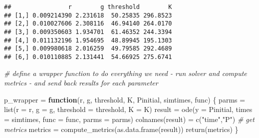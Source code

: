 \documentclass[
]{article}
\newenvironment{Shaded}{\begin{snugshade}}{\end{snugshade}}
\newcommand{\AttributeTok}[1]{\textcolor[rgb]{0.77,0.63,0.00}{#1}}
\newcommand{\CommentTok}[1]{\textcolor[rgb]{0.56,0.35,0.01}{\textit{#1}}}
\newcommand{\ConstantTok}[1]{\textcolor[rgb]{0.00,0.00,0.00}{#1}}
\newcommand{\ControlFlowTok}[1]{\textcolor[rgb]{0.13,0.29,0.53}{\textbf{#1}}}
\newcommand{\DecValTok}[1]{\textcolor[rgb]{0.00,0.00,0.81}{#1}}
\newcommand{\FunctionTok}[1]{\textcolor[rgb]{0.00,0.00,0.00}{#1}}
\newcommand{\NormalTok}[1]{#1}
\newcommand{\OtherTok}[1]{\textcolor[rgb]{0.56,0.35,0.01}{#1}}
\newcommand{\SpecialCharTok}[1]{\textcolor[rgb]{0.00,0.00,0.00}{#1}}
\newcommand{\StringTok}[1]{\textcolor[rgb]{0.31,0.60,0.02}{#1}}
\begin{document}
\begin{Shaded}
\end{Shaded}

\begin{verbatim}
##                r        g threshold        K
## [1,] 0.009214390 2.231618  50.25835 296.8523
## [2,] 0.010027606 2.308116  46.94140 264.0170
## [3,] 0.009350603 1.934701  61.46352 244.3394
## [4,] 0.011132196 1.954695  48.89945 195.1303
## [5,] 0.009980618 2.016259  49.79585 292.4689
## [6,] 0.010110885 2.131441  54.66925 275.6741
\end{verbatim}

\begin{Shaded}
\begin{Highlighting}[]
\CommentTok{\# define a wrapper function to do everything we need {-} run solver and compute metrics {-} and send back results for each parameter}

\NormalTok{p\_wrapper }\OtherTok{=} \ControlFlowTok{function}\NormalTok{(r, g, threshold, K, Pinitial, simtimes, func) \{}
\NormalTok{    parms }\OtherTok{=} \FunctionTok{list}\NormalTok{(}\AttributeTok{r =}\NormalTok{ r,}
                 \AttributeTok{g =}\NormalTok{ g,}
                 \AttributeTok{threshold =}\NormalTok{ threshold,}
                 \AttributeTok{K =}\NormalTok{ K)}
\NormalTok{    result }\OtherTok{=} \FunctionTok{ode}\NormalTok{(}\AttributeTok{y =}\NormalTok{ Pinitial, }
                 \AttributeTok{times =}\NormalTok{ simtimes, }
                 \AttributeTok{func =}\NormalTok{ func, }
                 \AttributeTok{parms =}\NormalTok{ parms) }
    \FunctionTok{colnames}\NormalTok{(result) }\OtherTok{=} \FunctionTok{c}\NormalTok{(}\StringTok{"time"}\NormalTok{,}\StringTok{"P"}\NormalTok{)}
  \CommentTok{\# get metrics}
\NormalTok{  metrics }\OtherTok{=} \FunctionTok{compute\_metrics}\NormalTok{(}\FunctionTok{as.data.frame}\NormalTok{(result))}
  \FunctionTok{return}\NormalTok{(metrics)}
\NormalTok{\}}
\end{Highlighting}
\end{Shaded}
\end{document}
